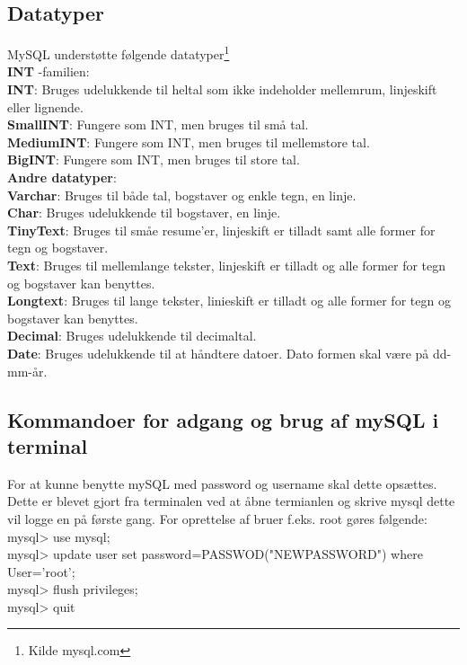 \subsection{Datatyper}
MySQL understøtte følgende datatyper\footnote{Kilde mysql.com} \\
\textbf{INT} -familien:\\
\textbf{INT}: Bruges udelukkende til heltal som ikke indeholder mellemrum, linjeskift eller lignende.\\
\textbf{SmallINT}: Fungere som INT, men bruges til små tal.\\
\textbf{MediumINT}: Fungere som INT, men bruges til mellemstore tal.\\
\textbf{BigINT}: Fungere som INT, men bruges til store tal.\\

\textbf{Andre datatyper}:\\
\textbf{Varchar}: Bruges til både tal, bogstaver og enkle tegn, en linje.\\
\textbf{Char}: Bruges udelukkende til bogstaver, en linje.\\
\textbf{TinyText}: Bruges til småe resume'er, linjeskift er tilladt samt alle former for tegn og bogstaver.\\
\textbf{Text}: Bruges til mellemlange  tekster, linjeskift er tilladt og alle former for tegn og bogstaver kan benyttes.\\
\textbf{Longtext}: Bruges til lange tekster, linieskift er tilladt og alle former for tegn og bogstaver kan benyttes.\\
\textbf{Decimal}: Bruges udelukkende til decimaltal.\\
\textbf{Date}: Bruges udelukkende til at håndtere datoer. Dato formen skal være på dd-mm-år.\\

\subsection{Kommandoer for adgang og brug af mySQL i terminal}
For at kunne benytte mySQL med password og username skal dette opsættes. Dette er blevet gjort fra terminalen ved at åbne termianlen og skrive mysql dette vil logge en på første gang. For oprettelse af bruer f.eks. root gøres følgende:\\
mysql> use mysql;\\
mysql> update user set password=PASSWOD("NEWPASSWORD") where User='root';\\
mysql> flush privileges;\\
mysql> quit

